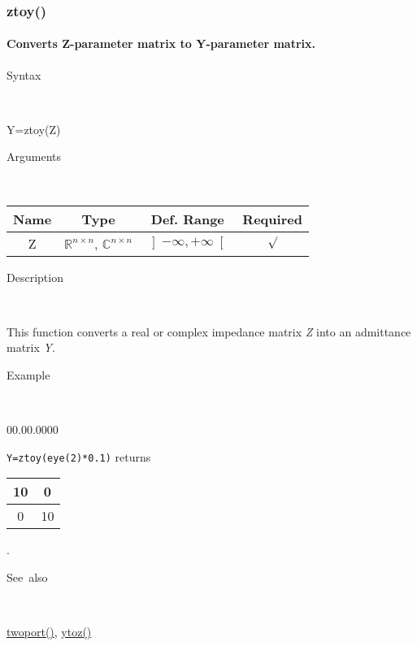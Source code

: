 \newpage
\subsubsection*{\hypertarget{ztoy}{}{\Large ztoy()}}


\paragraph{\label{par:ztoy}Converts Z-parameter matrix to Y-parameter matrix.}

\begin{description}
\item [Syntax]~
\end{description}
Y=ztoy(Z)

\begin{description}
\item [Arguments]~
\end{description}
\begin{tabular}{|c|c|c|c|}
\hline 
Name&
Type&
Def. Range&
Required\tabularnewline
\hline
\hline 
Z&
$\mathbb{R}^{n\times n}$, $\mathbb{C}^{n\times n}$&
$\left]-\infty,+\infty\right[$&
$\surd$\tabularnewline
\hline
\end{tabular}

\begin{description}
\item [Description]~
\end{description}
This function converts a real or complex impedance matrix \textit{Z}
into an admittance matrix \textit{Y}. 

\begin{description}
\item [Example]~
\end{description}
\begin{lyxlist}{00.00.0000}
\item [\texttt{Y=ztoy(eye(2){*}0.1)}]returns \begin{tabular}{|c|c|}
\hline 
10&
0\tabularnewline
\hline
0&
10\tabularnewline
\hline
\end{tabular}.
\end{lyxlist}
\begin{description}
\item [See~also]~
\end{description}
\textcolor{blue}{\hyperlink{twoport}{twoport()}}\textcolor{black}{,}
\textcolor{blue}{\hyperlink{ytoz}{ytoz()}}


\newpage
{}


